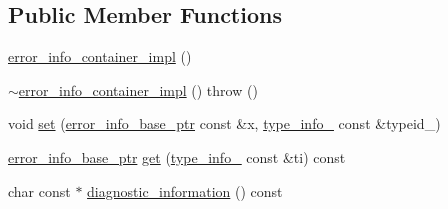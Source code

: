 \subsection*{Public Member Functions}
\begin{DoxyCompactItemize}
\item 
\hyperlink{classecto_1_1except_1_1error__info__container__impl_a258f844c2a2ee441c4e397971466f2c5}{error\-\_\-info\-\_\-container\-\_\-impl} ()
\item 
\hyperlink{classecto_1_1except_1_1error__info__container__impl_ab9391a11b1c7955810c184c07aec4858}{$\sim$error\-\_\-info\-\_\-container\-\_\-impl} ()  throw ()
\item 
void \hyperlink{classecto_1_1except_1_1error__info__container__impl_ac3931483b05bd3240a8ffe11c4977b99}{set} (\hyperlink{classecto_1_1except_1_1error__info__container__impl_a9fbca0758380cb123f790aee77d1d4d8}{error\-\_\-info\-\_\-base\-\_\-ptr} const \&x, \hyperlink{classecto_1_1except_1_1error__info__container__impl_abe4f51bf533842a5e0b81f3e43ae6267}{type\-\_\-info\-\_\-} const \&typeid\-\_\-)
\item 
\hyperlink{classecto_1_1except_1_1error__info__container__impl_a9fbca0758380cb123f790aee77d1d4d8}{error\-\_\-info\-\_\-base\-\_\-ptr} \hyperlink{classecto_1_1except_1_1error__info__container__impl_acab3219ea75b29048e2e4d8ad23028eb}{get} (\hyperlink{classecto_1_1except_1_1error__info__container__impl_abe4f51bf533842a5e0b81f3e43ae6267}{type\-\_\-info\-\_\-} const \&ti) const 
\item 
char const $\ast$ \hyperlink{classecto_1_1except_1_1error__info__container__impl_a9cd76f7d8bd75cdc5cf29061304a622a}{diagnostic\-\_\-information} () const 
\end{DoxyCompactItemize}
